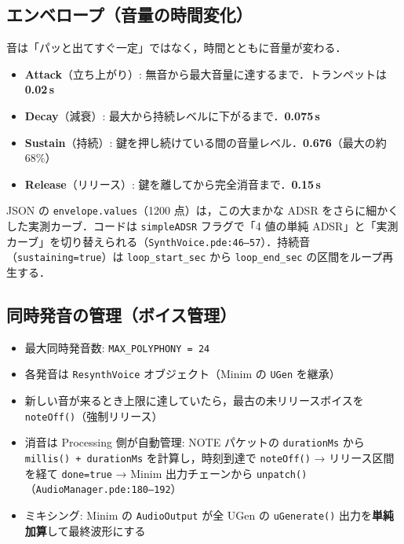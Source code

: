 \documentclass[uplatex,dvipdfmx,a4paper,10pt]{jsarticle}
\begin{document}
\subsection{エンベロープ（音量の時間変化）}

音は「パッと出てすぐ一定」ではなく，時間とともに音量が変わる．

\begin{itemize}
  \item \textbf{Attack}（立ち上がり）: 無音から最大音量に達するまで．トランペットは \textbf{0.02\,s}
  \item \textbf{Decay}（減衰）: 最大から持続レベルに下がるまで．\textbf{0.075\,s}
  \item \textbf{Sustain}（持続）: 鍵を押し続けている間の音量レベル．\textbf{0.676}（最大の約 68\%）
  \item \textbf{Release}（リリース）: 鍵を離してから完全消音まで．\textbf{0.15\,s}
\end{itemize}

JSON の \texttt{envelope.values}（1200 点）は，この大まかな ADSR をさらに細かくした実測カーブ．コードは \texttt{simpleADSR} フラグで「4 値の単純 ADSR」と「実測カーブ」を切り替えられる（\texttt{SynthVoice.pde:46--57}）．持続音（\texttt{sustaining=true}）は \texttt{loop\_start\_sec} から \texttt{loop\_end\_sec} の区間をループ再生する．

\subsection{同時発音の管理（ボイス管理）}

\begin{itemize}
  \item 最大同時発音数: \texttt{MAX\_POLYPHONY = 24}
  \item 各発音は \texttt{ResynthVoice} オブジェクト（Minim の \texttt{UGen} を継承）
  \item 新しい音が来るとき上限に達していたら，最古の未リリースボイスを \texttt{noteOff()}（強制リリース）
  \item 消音は Processing 側が自動管理: NOTE パケットの \texttt{durationMs} から \texttt{millis() + durationMs} を計算し，時刻到達で \texttt{noteOff()} → リリース区間を経て \texttt{done=true} → Minim 出力チェーンから \texttt{unpatch()}（\texttt{AudioManager.pde:180--192}）
  \item ミキシング: Minim の \texttt{AudioOutput} が全 UGen の \texttt{uGenerate()} 出力を\textbf{単純加算}して最終波形にする
\end{itemize}
\end{document}
